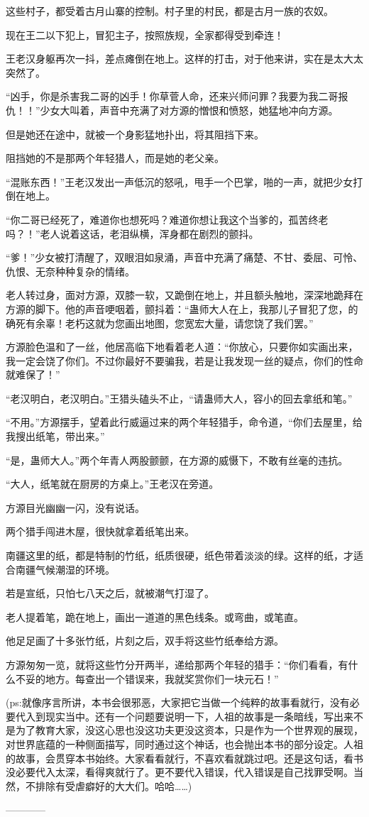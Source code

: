 \begin{this_body}
这些村子，都受着古月山寨的控制。村子里的村民，都是古月一族的农奴。

现在王二以下犯上，冒犯主子，按照族规，全家都得受到牵连！

王老汉身躯再次一抖，差点瘫倒在地上。这样的打击，对于他来讲，实在是太大太突然了。

“凶手，你是杀害我二哥的凶手！你草菅人命，还来兴师问罪？我要为我二哥报仇！！”少女大叫着，声音中充满了对方源的憎恨和愤怒，她猛地冲向方源。

但是她还在途中，就被一个身影猛地扑出，将其阻挡下来。

阻挡她的不是那两个年轻猎人，而是她的老父亲。

“混账东西！”王老汉发出一声低沉的怒吼，甩手一个巴掌，啪的一声，就把少女打倒在地上。

“你二哥已经死了，难道你也想死吗？难道你想让我这个当爹的，孤苦终老吗？！”老人说着这话，老泪纵横，浑身都在剧烈的颤抖。

“爹！”少女被打清醒了，双眼泪如泉涌，声音中充满了痛楚、不甘、委屈、可怜、仇恨、无奈种种复杂的情绪。

老人转过身，面对方源，双膝一软，又跪倒在地上，并且额头触地，深深地跪拜在方源的脚下。他的声音哽咽着，颤抖着：“蛊师大人在上，我那儿子冒犯了您，的确死有余辜！老朽这就为您画出地图，您宽宏大量，请您饶了我们罢。”

方源脸色温和了一丝，他居高临下地看着老人道：“你放心，只要你如实画出来，我一定会饶了你们。不过你最好不要骗我，若是让我发现一丝的疑点，你们的性命就难保了！”

“老汉明白，老汉明白。”王猎头磕头不止，“请蛊师大人，容小的回去拿纸和笔。”

“不用。”方源摆手，望着此行威逼过来的两个年轻猎手，命令道，“你们去屋里，给我搜出纸笔，带出来。”

“是，蛊师大人。”两个年青人两股颤颤，在方源的威慑下，不敢有丝毫的违抗。

“大人，纸笔就在厨房的方桌上。”王老汉在旁道。

方源目光幽幽一闪，没有说话。

两个猎手闯进木屋，很快就拿着纸笔出来。

南疆这里的纸，都是特制的竹纸，纸质很硬，纸色带着淡淡的绿。这样的纸，才适合南疆气候潮湿的环境。

若是宣纸，只怕七八天之后，就被潮气打湿了。

老人提着笔，跪在地上，画出一道道的黑色线条。或弯曲，或笔直。

他足足画了十多张竹纸，片刻之后，双手将这些竹纸奉给方源。

方源匆匆一览，就将这些竹分开两半，递给那两个年轻的猎手：“你们看看，有什么不妥的地方。每查出一个错误来，我就奖赏你们一块元石！”

(ps:就像序言所讲，本书会很邪恶，大家把它当做一个纯粹的故事看就行，没有必要代入到现实当中。还有一个问题要说明一下，人祖的故事是一条暗线，写出来不是为了教育大家，没这心思也没这功夫更没这资本，只是作为一个世界观的展现，对世界底蕴的一种侧面描写，同时通过这个神话，也会抛出本书的部分设定。人祖的故事，会贯穿本书始终。大家看看就行，不喜欢看就跳过吧。还是这句话，看书没必要代入太深，看得爽就行了。更不要代入错误，代入错误是自己找罪受啊。当然，不排除有受虐癖好的大大们。哈哈……)

------------

\end{this_body}

